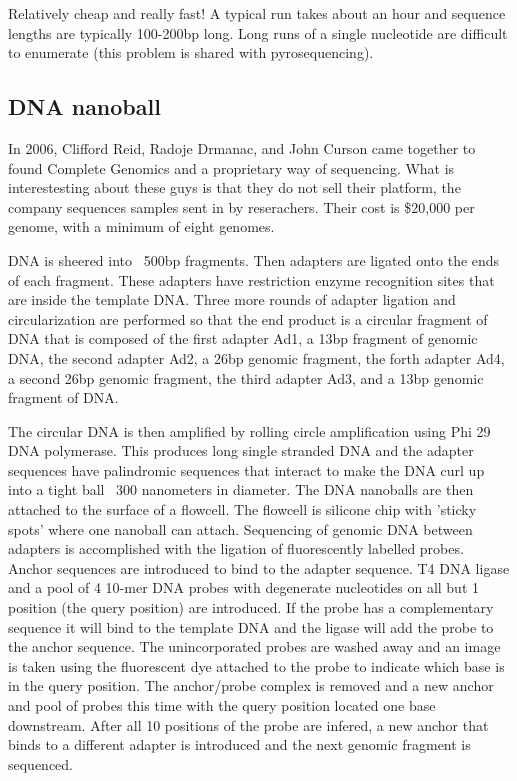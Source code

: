 \documentclass{report}\usepackage[]{graphicx}\usepackage[]{color}
\begin{document}
Relatively cheap and really fast! A typical run takes about an hour and sequence lengths are typically 
100-200bp long. Long runs of a single nucleotide are difficult to enumerate (this problem is shared with 
pyrosequencing). 

\subsection*{DNA nanoball}
In 2006, Clifford Reid, Radoje Drmanac, and John Curson came together to found Complete Genomics 
and a proprietary way of sequencing. What is interestesting about these guys is that they do not sell 
their platform, the company sequences samples sent in by reserachers. Their cost is \$20,000 per genome,
with a minimum of eight genomes. 

DNA is sheered into ~500bp fragments. Then adapters are ligated onto the ends of each fragment. These
adapters have restriction enzyme recognition sites that are inside the template DNA. Three more 
rounds of adapter ligation and circularization are performed so that the end product is a circular fragment of 
DNA that is composed of the first adapter Ad1, a 13bp fragment of genomic DNA, the second adapter Ad2, a 26bp 
genomic fragment, 
the forth adapter Ad4, a second 26bp genomic fragment, the third adapter Ad3, and a 13bp genomic 
fragment of DNA. 

The circular DNA is then amplified by rolling circle amplification using 
Phi 29 DNA polymerase. This produces long single stranded DNA and the adapter 
sequences have palindromic sequences that interact to make the DNA curl up into
a tight ball ~300 nanometers in diameter. The DNA nanoballs are then attached
to the surface of a flowcell. The flowcell is silicone chip with 'sticky spots' where 
one nanoball can attach. Sequencing of genomic DNA between adapters is accomplished
with the ligation of fluorescently labelled probes. Anchor sequences are introduced to 
bind to the adapter sequence. T4 DNA ligase and a pool of 4 10-mer DNA probes with 
degenerate nucleotides on all but 1 position (the query position) are introduced. If the probe
has a complementary sequence it will bind to the template DNA and the ligase will add the 
probe to the anchor sequence. The unincorporated probes are washed away and an image
is taken using the fluorescent dye attached to the probe to indicate which base is in the 
query position. The anchor/probe complex is removed and a new anchor and pool of 
probes this time with the query position located one base downstream. After all 10 positions
of the probe are infered, a new anchor that binds to a different adapter is introduced and 
the next genomic fragment is sequenced. 
\end{document}
